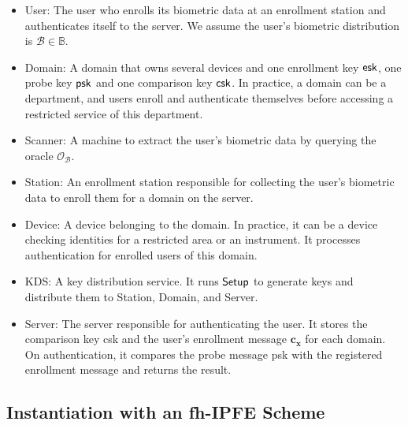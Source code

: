 \begin{itemize}

	\item {\sf User}: The user who enrolls its biometric data at an enrollment station and authenticates itself to the server. We assume the user's biometric distribution is $\mathcal{B} \in \mathbb{B}$.
	
	\item {\sf Domain}: A domain that owns several devices and one enrollment key ${\sf esk}$, one probe key ${\sf psk}$ and one comparison key ${\sf csk}$. In practice, a domain can be a department, and users enroll and authenticate themselves before accessing a restricted service of this department.

	\item {\sf Scanner}: A machine to extract the user's biometric data by querying the oracle $\mathcal{O}_{\mathcal{B}}$.
	
	\item {\sf Station}: An enrollment station responsible for collecting the user's biometric data to enroll them for a domain on the server.

	\item {\sf Device}: A device belonging to the domain. In practice, it can be a device checking identities for a restricted area or an instrument. It processes authentication for enrolled users of this domain.
	
	\item {\sf KDS}: A key distribution service. It runs ${\sf Setup}$ to generate keys and distribute them to {\sf Station}, {\sf Domain}, and {\sf Server}.
		
	\item {\sf Server}: The server responsible for authenticating the user. It stores the comparison key {\sf csk} and the user's enrollment message $\mathbf{c_x}$ for each domain. On authentication, it compares the probe message {\sf psk} with the registered enrollment message and returns the result.  

\end{itemize}






\subsection{Instantiation with an fh-IPFE Scheme}
\label{sec:instantiation}

